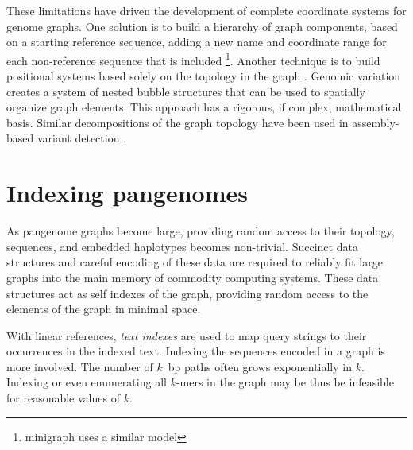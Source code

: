These limitations have driven the development of complete coordinate systems for genome graphs.
One solution is to build a hierarchy of graph components, based on a starting reference sequence, adding a new name and coordinate range for each non-reference sequence that is included \cite{Rand_2017}\footnote{minigraph uses a similar model}.
Another technique is to build positional systems based solely on the topology in the graph \cite{paten2018superbubbles}.
Genomic variation creates a system of nested bubble structures that can be used to spatially organize graph elements.
This approach has a rigorous, if complex, mathematical basis.
Similar decompositions of the graph topology have been used in assembly-based variant detection \cite{Iqbal_2012, Onodera_2013}.


\section{Indexing pangenomes} %
\label{sec:indexing}

As pangenome graphs become large, providing random access to their topology, sequences, and embedded haplotypes becomes non-trivial.
Succinct data structures and careful encoding of these data are required to reliably fit large graphs into the main memory of commodity computing systems.
These data structures act as self indexes of the graph, providing random access to the elements of the graph in minimal space.

With linear references, \emph{text indexes} are used to map query strings to their occurrences in the indexed text.
Indexing the sequences encoded in a graph is more involved.
The number of $k$~bp paths often grows exponentially in $k$.
Indexing or even enumerating all $k$-mers in the graph may be thus be infeasible for reasonable values of $k$.

